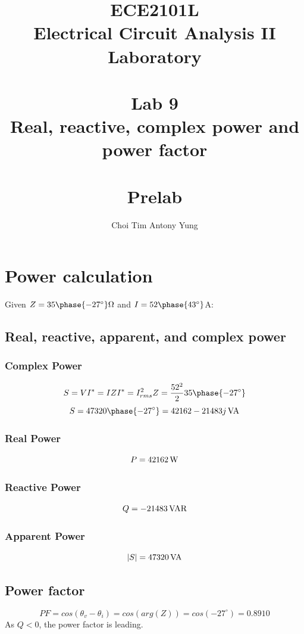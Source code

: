 \documentclass{article}
\title{ECE2101L\\Electrical Circuit Analysis II Laboratory\\\,\\Lab 9\\Real, reactive, complex power and power factor\\\,\\Prelab\\}
\author{Choi Tim Antony Yung}
\begin{document}
\clearpage\maketitle
\thispagestyle{empty}
\newpage
\setcounter{page}{1}

\section{Power calculation}
Given $Z=35\phase{-27^{\circ}}\Omega$ and $I=52\phase{43^{\circ}}$A:

\subsection{Real, reactive, apparent, and complex power}
\subsubsection{Complex Power}
$$S=VI^*=IZI^*=I_{rms}^2Z = \frac{52^2}{2}35\phase{-27^{\circ}}$$
$$S=47320\phase{-27^{\circ}}=42162-21483j\text{\,VA}$$
\subsubsection{Real Power}
$$P=42162\text{\,W}$$
\subsubsection{Reactive Power}
$$Q=-21483\text{\,VAR}$$
\subsubsection{Apparent Power}
$$|S|=47320\text{\,VA}$$

\subsection{Power factor}
$$PF=cos(\theta_v-\theta_i)=cos(arg(Z))=cos(-27^{\circ})=0.8910$$
As $Q<0$, the power factor is leading.
\end{document}
